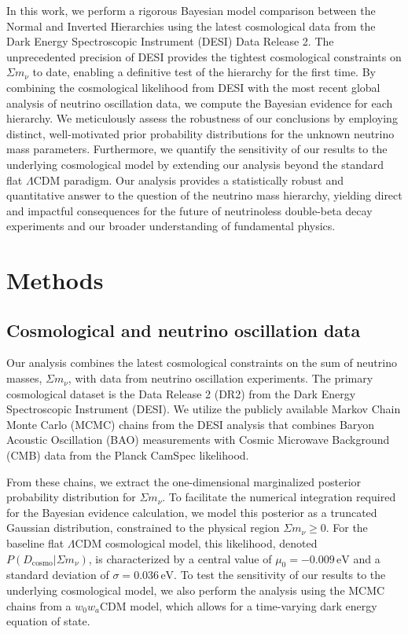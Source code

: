 \documentclass[]{article}
\begin{document}
In this work, we perform a rigorous Bayesian model comparison between the Normal and Inverted Hierarchies using the latest cosmological data from the Dark Energy Spectroscopic Instrument (DESI) Data Release 2. The unprecedented precision of DESI provides the tightest cosmological constraints on $\Sigma m_\nu$ to date, enabling a definitive test of the hierarchy for the first time. By combining the cosmological likelihood from DESI with the most recent global analysis of neutrino oscillation data, we compute the Bayesian evidence for each hierarchy. We meticulously assess the robustness of our conclusions by employing distinct, well-motivated prior probability distributions for the unknown neutrino mass parameters. Furthermore, we quantify the sensitivity of our results to the underlying cosmological model by extending our analysis beyond the standard flat $\Lambda$CDM paradigm. Our analysis provides a statistically robust and quantitative answer to the question of the neutrino mass hierarchy, yielding direct and impactful consequences for the future of neutrinoless double-beta decay experiments and our broader understanding of fundamental physics.

\section{Methods}
\label{sec:methods}
\subsection{Cosmological and neutrino oscillation data}
Our analysis combines the latest cosmological constraints on the sum of neutrino masses, $\Sigma m_\nu$, with data from neutrino oscillation experiments. The primary cosmological dataset is the Data Release 2 (DR2) from the Dark Energy Spectroscopic Instrument (DESI). We utilize the publicly available Markov Chain Monte Carlo (MCMC) chains from the DESI analysis that combines Baryon Acoustic Oscillation (BAO) measurements with Cosmic Microwave Background (CMB) data from the Planck CamSpec likelihood.

From these chains, we extract the one-dimensional marginalized posterior probability distribution for $\Sigma m_\nu$. To facilitate the numerical integration required for the Bayesian evidence calculation, we model this posterior as a truncated Gaussian distribution, constrained to the physical region $\Sigma m_\nu \ge 0$. For the baseline flat $\Lambda$CDM cosmological model, this likelihood, denoted $P(D_{\text{cosmo}}|\Sigma m_\nu)$, is characterized by a central value of $\mu_0 = -0.009\,\text{eV}$ and a standard deviation of $\sigma = 0.036\,\text{eV}$. To test the sensitivity of our results to the underlying cosmological model, we also perform the analysis using the MCMC chains from a $w_0w_a$CDM model, which allows for a time-varying dark energy equation of state.
\end{document}
